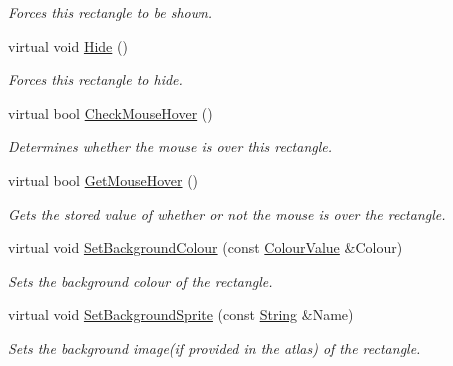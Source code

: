 \begin{DoxyCompactItemize}
\begin{DoxyCompactList}\small\item\em Forces this rectangle to be shown. \item\end{DoxyCompactList}\item 
\hypertarget{classphys_1_1UI_1_1Rectangle_a25bad72cff62c5c69b224bcb74304661}{
virtual void \hyperlink{classphys_1_1UI_1_1Rectangle_a25bad72cff62c5c69b224bcb74304661}{Hide} ()}
\label{d1/d5d/classphys_1_1UI_1_1Rectangle_a25bad72cff62c5c69b224bcb74304661}

\begin{DoxyCompactList}\small\item\em Forces this rectangle to hide. \item\end{DoxyCompactList}\item 
virtual bool \hyperlink{classphys_1_1UI_1_1Rectangle_a246070a93416c2c50d63720b354154d7}{CheckMouseHover} ()
\begin{DoxyCompactList}\small\item\em Determines whether the mouse is over this rectangle. \item\end{DoxyCompactList}\item 
virtual bool \hyperlink{classphys_1_1UI_1_1Rectangle_a20903adb6d1b8650d73774190a2b9c57}{GetMouseHover} ()
\begin{DoxyCompactList}\small\item\em Gets the stored value of whether or not the mouse is over the rectangle. \item\end{DoxyCompactList}\item 
virtual void \hyperlink{classphys_1_1UI_1_1Rectangle_a687b524b89e6a76bc102b60023d36abd}{SetBackgroundColour} (const \hyperlink{classphys_1_1ColourValue}{ColourValue} \&Colour)
\begin{DoxyCompactList}\small\item\em Sets the background colour of the rectangle. \item\end{DoxyCompactList}\item 
virtual void \hyperlink{classphys_1_1UI_1_1Rectangle_ae9cc47125e075aaa9bfd397762de6e0c}{SetBackgroundSprite} (const \hyperlink{namespacephys_aa03900411993de7fbfec4789bc1d392e}{String} \&Name)
\begin{DoxyCompactList}\small\item\em Sets the background image(if provided in the atlas) of the rectangle. \item\end{DoxyCompactList}\item 

\end{DoxyCompactItemize}

